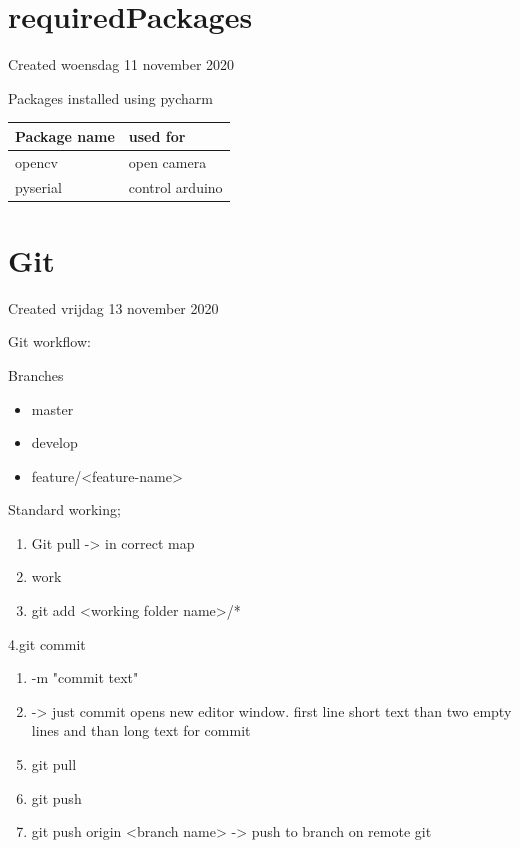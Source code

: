 \documentclass{article}
\begin{document}
		\section{requiredPackages}

Created woensdag 11 november 2020



Packages installed using pycharm

\begin{tabular}{ |l|l| }
\hline
 Package name & used for \tabularnewline
\hline
\hline
 opencv & open camera \tabularnewline
\hline
 pyserial & control arduino \tabularnewline
\hline
\end{tabular}

		\section{Git}

Created vrijdag 13 november 2020



Git workflow:



Branches

\begin{itemize}
\item master
\item develop
\item feature/\textless{}feature-name\textgreater{}
\end{itemize}


Standard working;

\begin{enumerate}[1]
\item Git pull -\textgreater{} in correct map
\item work
\item git add \textless{}working folder name\textgreater{}/*
\end{enumerate}
4.git commit

	\begin{enumerate}[a]
	\item -m "commit text"
	\item -\textgreater{} just commit opens new editor window. first line short text than two empty lines and than long text for commit
	\end{enumerate}
\begin{enumerate}[1]
\setcounter{enumi}{4}
\item git pull
\item git push
\item git push origin \textless{}branch name\textgreater{} -\textgreater{} push to branch on remote git
\end{enumerate}
\end{document}
